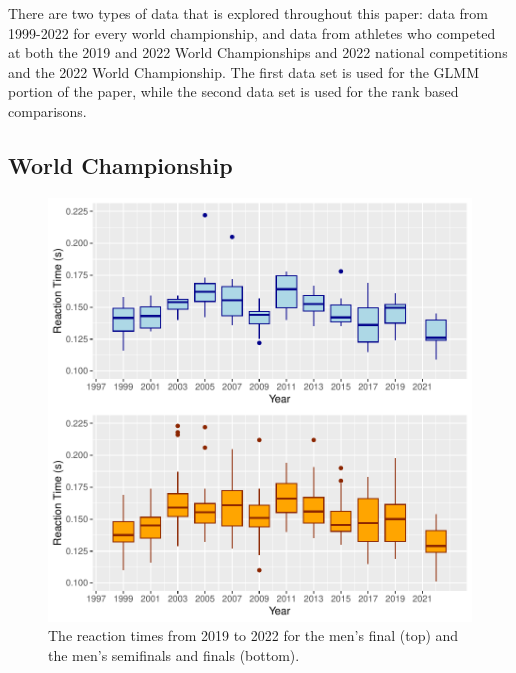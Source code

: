 \documentclass[12pt, letterpaper, titlepage]{article}
\begin{document}
There are two types of data that is explored throughout this paper: data from
1999-2022 for every world championship, and data from athletes who competed
at both the 2019 and 2022 World Championships and 2022 national competitions
and the 2022 World Championship.  The first data set is used for the GLMM portion
of the paper, while the second data set is used for the rank based comparisons.

\subsection{World Championship}


\begin{figure}[tbp]
  \centering
  \includegraphics{Finals_Pooled_Boxplot}
  \caption{The reaction times from 2019 to 2022 for the men's final (top) and
  the men's semifinals and finals (bottom).}
  \label{fig:Boxplots}
\end{figure}
\end{document}
